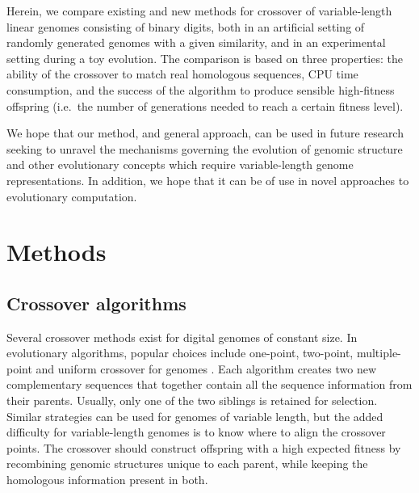 \documentclass[10pt]{article}
\renewcommand{\paragraph}[1]{\textbf{#1}\hspace{2ex}}
\renewcommand{\paragraph}[1]{}
\begin{document}
\paragraph{Goal of this paper} Herein, we compare existing and new methods for
crossover of variable-length linear genomes consisting of binary digits,
both in an artificial setting of randomly generated
genomes with a given similarity, and in an experimental setting during a toy
evolution. The comparison is based on three properties: the ability of the
crossover to match real homologous sequences, CPU time consumption, and the
success of the algorithm to produce sensible high-fitness offspring (i.e.\ the
number of generations needed to reach a certain fitness level).

\paragraph{Application and future prospects}
We hope that our method, and general approach, can be used in future
research seeking to unravel the mechanisms governing the evolution of
genomic structure and other evolutionary concepts which require variable-length
genome representations. In addition, we hope that it can be of use
in novel approaches to evolutionary computation.

\section{Methods}

\subsection{Crossover algorithms}

Several crossover methods exist for digital genomes of constant size.
In evolutionary algorithms, popular choices include one-point, two-point,
multiple-point and uniform crossover for genomes \cite{yu2010}.
Each algorithm creates two new complementary sequences that together contain all the
sequence information from their parents. Usually, only one of the two  siblings is
retained for selection. Similar strategies
can be used for genomes of variable length, but the added difficulty for
variable-length genomes is to know where to align the crossover points. The
crossover should construct offspring with a high expected fitness by recombining
genomic structures unique to each parent, while keeping the homologous information
present in both.
\end{document}
